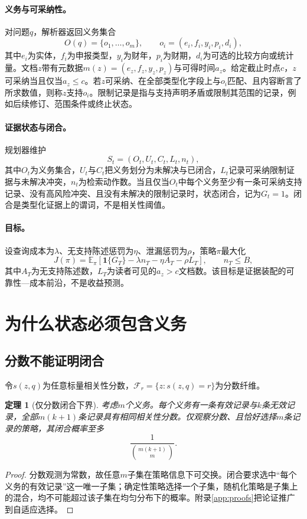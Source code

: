 \documentclass[10.5pt,a4paper]{ctexart}
\newtheorem{theorem}{定理}
\newcommand{\E}{\mathbb{E}}
\newcommand{\indic}[1]{\mathbf{1}\{#1\}}
\begin{document}
\paragraph{义务与可采纳性。}对问题$q$，解析器返回义务集合
\begin{equation}
O(q)=\{o_1,\dots,o_m\},\qquad o_i=(e_i,f_i,y_i,p_i,d_i),
\end{equation}
其中$e_i$为实体，$f_i$为申报类型，$y_i$为财年，$p_i$为财期，$d_i$为可选的比较方向或统计量。文档$z$带有元数据$m(z)=(e_z,f_z,y_z,p_z)$与可得时间$a_z$。给定截止时点$c$，$z$可采纳当且仅当$a_z\le c$。若$z$可采纳、在全部类型化字段上与$o_i$匹配、且内容断言了所求数值，则称$z$支持$o_i$。限制记录是指与支持声明矛盾或限制其范围的记录，例如后续修订、范围条件或终止状态。

\paragraph{证据状态与闭合。}规划器维护
\begin{equation}
S_t=(O_t,U_t,C_t,L_t,n_t),
\end{equation}
其中$O_t$为义务集合，$U_t$与$C_t$把义务划分为未解决与已闭合，$L_t$记录可采纳限制证据与未解决冲突，$n_t$为检索动作数。当且仅当$O_t$中每个义务至少有一条可采纳支持记录、没有高风险冲突、且没有未解决的限制记录时，状态闭合，记为$G_t=1$。闭合是类型化证据上的谓词，不是相关性阈值。

\paragraph{目标。}设查询成本为$\lambda$、无支持陈述惩罚为$\eta$、泄漏惩罚为$\rho$，策略$\pi$最大化
\begin{equation}
J(\pi)=\E_{\pi}\!\left[\indic{G_T}-\lambda n_T-\eta A_T-\rho L_T\right],\qquad n_T\le B,
\label{eq:objective}
\end{equation}
其中$A_T$为无支持陈述数，$L_T$为读者可见的$a_z>c$文档数。该目标是证据装配的可靠性—成本前沿，不是收益预测。

\section{为什么状态必须包含义务}
\label{sec:theory}
\subsection{分数不能证明闭合}
令$s(z,q)$为任意标量相关性分数，$\mathcal{F}_r=\{z:s(z,q)=r\}$为分数纤维。

\begin{theorem}[仅分数闭合下界]
\label{thm:score}
考虑$m$个义务。每个义务有一条有效记录与$k$条无效记录，全部$m(k+1)$条记录具有相同相关性分数。仅观察分数、且恰好选择$m$条记录的策略，其闭合概率至多
\begin{equation}
\frac{1}{\binom{m(k+1)}{m}}.
\end{equation}
\end{theorem}
\begin{proof}
分数观测为常数，故任意$m$子集在策略信息下可交换。闭合要求选中“每个义务的有效记录”这一唯一子集；确定性策略选择一个子集，随机化策略是子集上的混合，均不可能超过该子集在均匀分布下的概率。附录\ref{app:proofs}把论证推广到自适应选择。
\end{proof}
\end{document}
